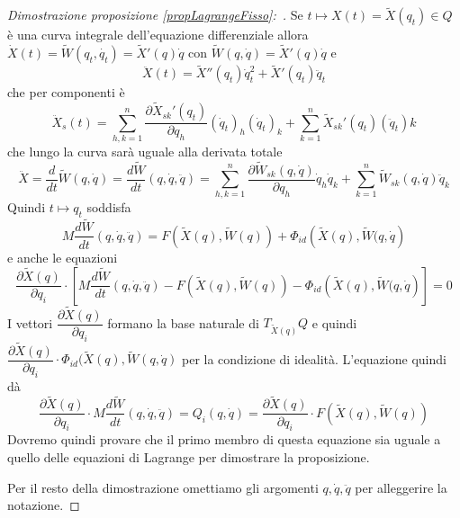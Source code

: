 \documentclass[11pt,a4paper,twoside]{book}
\newenvironment{dimo}[1][\proofname]{
	\begin{tcolorbox}[
	breakable, 
	enhanced, 
	interior hidden, 
	frame hidden, 
	borderline west = {1pt}{0pt}{gray}, 
	top=0pt, bottom=0pt, left=0pt]
\begin{proof}[#1:~]
}
{
\end{proof}
\end{tcolorbox}
}
\theoremstyle{esss}
\theoremstyle{dotless}
\numberwithin{equation}{section} %
\begin{document}
\begin{dimo}[Dimostrazione proposizione \ref{propLagrangeFisso}]
Se $t\mapsto X(t)=\tilde{X}(q_t)\in Q$ è una curva integrale dell'equazione differenziale allora $\dot{X}(t)=\tilde{W}(q_t,\dot{q_t})=\tilde{X}'(q)\dot{q}$ con $\tilde{W}(q,\dot{q})=\tilde{X}'(q)\dot{q}$ e
\[
\ddot{X}(t)= \tilde{X}''(q_t)\dot{q}_t^2 + \tilde{X}'(q_t)\ddot{q}_t\]
che per componenti è 
\[ 
\ddot{X}_s(t)=\sum_{h,k=1}^{n}\dfrac{\partial \tilde{X}_{sk}'(q_t)}{\partial q_h} (\dot{q}_t)_h (\dot{q}_t)_k + \sum_{k=1}^n \tilde{X}_{sk}'(q_t) (\ddot{q}_t)k
\]
che lungo la curva sarà uguale alla derivata totale
\[
\ddot{X}=\dfrac{d}{dt}\tilde{W}(q,\dot{q})=\dfrac{d\tilde{W}}{dt}(q,\dot{q},\ddot{q})=\sum_{h,k=1}^{n}\dfrac{\partial \tilde{W}_{sk}(q,\dot{q})}{\partial q_h} \dot{q}_h \dot{q}_k + \sum_{k=1}^n \tilde{W}_{sk}(q,\dot{q}) \ddot{q}_k
\]
Quindi $t\mapsto q_t$ soddisfa
\[
M\dfrac{d\tilde{W}}{dt}(q,\dot{q},\ddot{q})=F\left(\tilde{X}(q),\tilde{W}(q)\right)+\Phi_{id}\left(\tilde{X}(q),\tilde{W}(q,\dot{q}\right)
\]
e anche le equazioni
\begin{equation}\label{eqPrincipioDAlembert}
\dfrac{\partial \tilde{X}(q)}{\partial q_i} \cdot \left[ M\dfrac{d\tilde{W}}{dt}(q,\dot{q},\ddot{q})-F\left(\tilde{X}(q),\tilde{W}(q)\right)-\Phi_{id}\left(\tilde{X}(q),\tilde{W}(q,\dot{q}\right)
\right]=0
\end{equation}
I vettori $\dfrac{\partial\tilde{X}(q)}{\partial q_i}$ formano la base naturale di $T_{\tilde{X}(q)}Q$ e quindi $\dfrac{\partial\tilde{X}(q)}{\partial q_i}\cdot\Phi_{id}(\tilde{X}(q),\tilde{W}(q,\dot{q})$ per la condizione di idealità.
L'equazione quindi dà
\[
\dfrac{\partial \tilde{X}(q)}{\partial q_i} \cdot  M\dfrac{d\tilde{W}}{dt}(q,\dot{q},\ddot{q})
=Q_i(q,\dot{q})=\dfrac{\partial\tilde{X}(q)}{\partial q_i} \cdot F\left(\tilde{X}(q),\tilde{W}(q)\right)
\]
Dovremo quindi provare che il primo membro di questa equazione sia uguale a quello delle equazioni di Lagrange per dimostrare la proposizione.

Per il resto della dimostrazione omettiamo gli argomenti $q,\dot{q},\ddot{q}$ per alleggerire la notazione.


\end{dimo}
\end{document}
